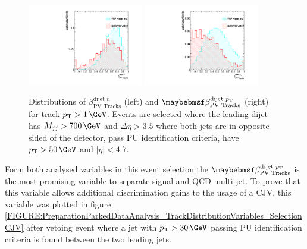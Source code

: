 \begin{figure}[!htb]
\centering
\includegraphics[width=0.45\textwidth]{Chapter06/TrackVariables/Images/Tracks1_TracksNRatio.pdf} 
\includegraphics[width=0.45\textwidth]{Chapter06/TrackVariables/Images/Tracks1_TracksERatio.pdf}
\caption{Distributions of $\beta_{\text{PV Tracks}}^{\text{dijet }n}$ (left) and $\beta_{\text{PV Tracks}}^{\text{dijet }\pt}$ (right) for track $\pt>1\,\GeV$. Events are selected where the leading dijet has $M_{jj}>700\,\GeV$ and $\Delta\eta>3.5$ where both jets are in opposite sided of the detector, pass \gls{PU} identification criteria, have $\pt>50\,\GeV$ and $|\eta|<4.7$.}
\label{FIGURE:PreparationParkedDataAnalysis_TrackDistributionVariables_Selection}
\end{figure}

Form both analysed variables in this event selection the $\beta_{\text{PV Tracks}}^{\text{dijet }\pt}$ is the most promising variable to separate signal and \gls{QCD} multi-jet. To prove that this variable allows additional discrimination gains to the usage of a \gls{CJV}, this variable was plotted in figure \ref{FIGURE:PreparationParkedDataAnalysis_TrackDistributionVariables_SelectionCJV} after vetoing event where a jet with $\pt>30\,\GeV$ passing \gls{PU} identification criteria is found between the two leading jets.

